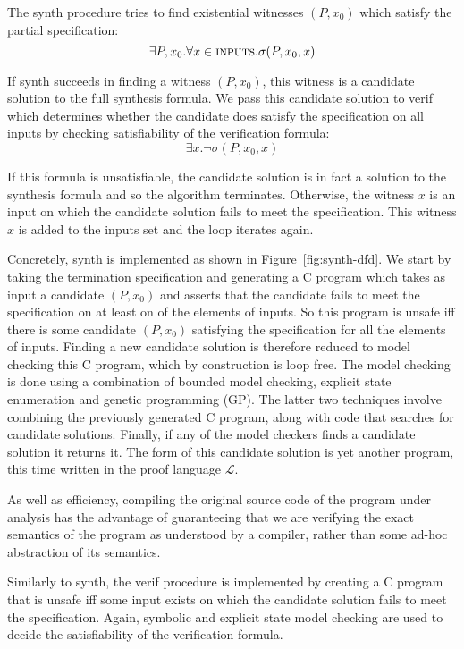 \documentclass[preprint]{sigplanconf}
\theoremstyle{definition}
\begin{document}
The {\sc synth} procedure tries to find existential witnesses $(P, x_0)$
which satisfy the partial specification:
%
\[
 \exists P, x_0 . \forall x \in \text{\sc inputs} . \sigma(P, x_0, x)
\]

If {\sc synth} succeeds in finding a witness $(P, x_0)$, this witness is a candidate solution to the full
synthesis formula.  We pass this candidate solution to {\sc verif} which determines whether the candidate
does satisfy the specification on all inputs by checking satisfiability of the verification formula:
\[
 \exists x . \lnot \sigma(P, x_0, x)
\]

If this formula is unsatisfiable, the candidate solution is in fact a
solution to the synthesis formula and so the algorithm terminates. 
Otherwise, the witness $x$ is an input on which the candidate solution fails
to meet the specification.  This witness $x$ is added to the {\sc inputs}
set and the loop iterates again.

Concretely, {\sc synth} is implemented as shown in
Figure~\ref{fig:synth-dfd}.  We start by taking the termination
specification and generating a C program which takes as input a candidate
$(P, x_0)$ and asserts that the candidate fails to meet the specification on
at least on of the elements of {\sc inputs}.  So this program is unsafe iff
there is some candidate $(P, x_0)$ satisfying the specification for all the
elements of {\sc inputs}.  Finding a new candidate solution is therefore
reduced to model checking this C program, which by construction is loop
free.  The model checking is done using a combination of bounded model
checking, explicit state enumeration and genetic programming (GP).  The
latter two techniques involve combining the previously generated C program,
along with code that searches for candidate solutions.  Finally, if any of
the model checkers finds a candidate solution it returns it.  The form of
this candidate solution is yet another program, this time written in the
proof language $\mathcal{L}$.

As well as efficiency, compiling the original source code of the program
under analysis has the advantage of guaranteeing that we are verifying the
exact semantics of the program as understood by a compiler, rather than some
ad-hoc abstraction of its semantics.

Similarly to {\sc synth}, the {\sc verif} procedure is implemented by
creating a C program that is unsafe iff some input exists on which the
candidate solution fails to meet the specification.  Again, symbolic and
explicit state model checking are used to decide the satisfiability of the
verification formula.
\end{document}
